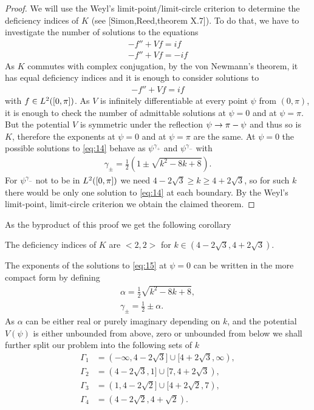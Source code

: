 \begin{proof}
  We will use the Weyl's limit-point/limit-circle criterion to
  determine the deficiency indices of $K$ (see [Simon,Reed,theorem
  X.7]). To do that, we have to investigate the number of solutions to
  the equations
  \begin{align}
    \label{eq:12}
    -f''+Vf=if\\
    -f''+Vf=-if
  \end{align}
  As $K$ commutes with complex conjugation, by the von Newmann's
  theorem, it has equal deficiency indices and it is enough to
  consider solutions to
  \begin{align}
    \label{eq:14}
    -f''+Vf=if
  \end{align}
  with $f\in L^2([0,\pi])$. As $V$ is infinitely differentiable at every point
  $\psi$ from $(0,\pi)$, it is enough to check the number of
  admittable solutions at $\psi=0$ and at $\psi=\pi$. But the
  potential $V$ is symmetric under the reflection $\psi\rightarrow\pi-\psi$
  and thus so is $K$, therefore the exponents at $\psi=0$ and at
  $\psi=\pi$ are the same. At $\psi=0$ the possible solutions to
  \eqref{eq:14} behave as $\psi^{\gamma_+}$ and $\psi^{\gamma_-}$ with
  \begin{align}
    \label{eq:10}
    \gamma_\pm=\frac{1}{2}\left(1\pm\sqrt{k^2-8k+8}\right).
  \end{align}
  For $\psi^{\gamma_-}$ not to be in $L^2([0,\pi])$ we need $4-2\sqrt{3}\ge
  k\ge4+2\sqrt{3}$, so for such $k$ there would be only one solution
  to \eqref{eq:14} at each boundary. By the Weyl's limit-point,
  limit-circle criterion we obtain the claimed theorem.
\end{proof}
As the byproduct of this proof we get the following corollary
\begin{corollary}
  The deficiency indices of $K$ are $<2,2>$ for
  $k\in(4-2\sqrt{3},4+2\sqrt{3})$.
\end{corollary}
The exponents of the solutions to \eqref{eq:15} at $\psi=0$ can be
written in the more compact form by defining
\begin{align}
  \label{eq:18}
  \alpha=\frac{1}{2}\sqrt{k^2-8k+8},\\
  \gamma_\pm=\frac{1}{2}\pm\alpha.
\end{align}
As $\alpha$ can be either real or purely imaginary depending on $k$,
and the potential $V(\psi)$ is either unbounded from above, zero or
unbounded from below we shall further split our problem into the
following sets of $k$
\begin{align}
  \label{eq:20}
  \Gamma_1&=(-\infty,4-2\sqrt{3}]\cup[4+2\sqrt{3},\infty),\\
  \Gamma_2&=(4-2\sqrt{3},1]\cup[7,4+2\sqrt{3}),\\
  \Gamma_3&=(1,4-2\sqrt{2}]\cup[4+2\sqrt{2},7),\\
  \Gamma_4&=(4-2\sqrt{2},4+\sqrt{2}).
\end{align}
